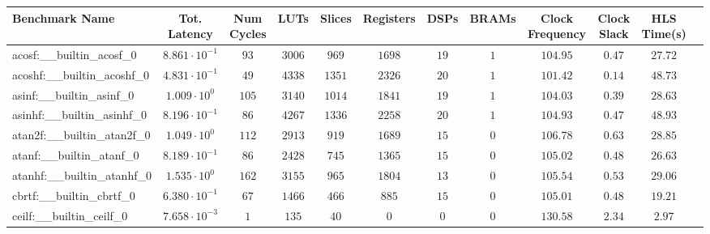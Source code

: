 \begin{tabular}{|l|c|c|c|c|c|c|c|c|c|c|c|}
\hline
Benchmark Name                            & Tot. Latency            & Num Cycles & LUTs      & Slices    & Registers & DSPs    & BRAMs & Clock Frequency & Clock Slack & HLS Time(s) \\
\hline
acosf:\_\_builtin\_acosf\_0               & $ 8.861 \cdot 10^{-1} $ & $ 93     $ & $ 3006  $ & $ 969   $ & $ 1698  $ & $ 19  $ & $ 1 $ & $ 104.95      $ & $ 0.47    $ & $ 27.72   $ \\
acoshf:\_\_builtin\_acoshf\_0             & $ 4.831 \cdot 10^{-1} $ & $ 49     $ & $ 4338  $ & $ 1351  $ & $ 2326  $ & $ 20  $ & $ 1 $ & $ 101.42      $ & $ 0.14    $ & $ 48.73   $ \\
asinf:\_\_builtin\_asinf\_0               & $ 1.009 \cdot 10^{0}  $ & $ 105    $ & $ 3140  $ & $ 1014  $ & $ 1841  $ & $ 19  $ & $ 1 $ & $ 104.03      $ & $ 0.39    $ & $ 28.63   $ \\
asinhf:\_\_builtin\_asinhf\_0             & $ 8.196 \cdot 10^{-1} $ & $ 86     $ & $ 4267  $ & $ 1336  $ & $ 2258  $ & $ 20  $ & $ 1 $ & $ 104.93      $ & $ 0.47    $ & $ 48.93   $ \\
atan2f:\_\_builtin\_atan2f\_0             & $ 1.049 \cdot 10^{0}  $ & $ 112    $ & $ 2913  $ & $ 919   $ & $ 1689  $ & $ 15  $ & $ 0 $ & $ 106.78      $ & $ 0.63    $ & $ 28.85   $ \\
atanf:\_\_builtin\_atanf\_0               & $ 8.189 \cdot 10^{-1} $ & $ 86     $ & $ 2428  $ & $ 745   $ & $ 1365  $ & $ 15  $ & $ 0 $ & $ 105.02      $ & $ 0.48    $ & $ 26.63   $ \\
atanhf:\_\_builtin\_atanhf\_0             & $ 1.535 \cdot 10^{0}  $ & $ 162    $ & $ 3155  $ & $ 965   $ & $ 1804  $ & $ 13  $ & $ 0 $ & $ 105.54      $ & $ 0.53    $ & $ 29.06   $ \\
cbrtf:\_\_builtin\_cbrtf\_0               & $ 6.380 \cdot 10^{-1} $ & $ 67     $ & $ 1466  $ & $ 466   $ & $ 885   $ & $ 15  $ & $ 0 $ & $ 105.01      $ & $ 0.48    $ & $ 19.21   $ \\
ceilf:\_\_builtin\_ceilf\_0               & $ 7.658 \cdot 10^{-3} $ & $ 1      $ & $ 135   $ & $ 40    $ & $ 0     $ & $ 0   $ & $ 0 $ & $ 130.58      $ & $ 2.34    $ & $ 2.97    $ \\

\end{tabular}

